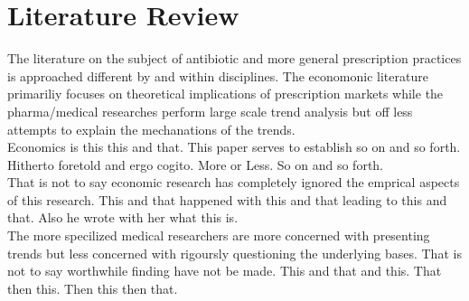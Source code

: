 \section{Literature Review}
The literature on the subject of antibiotic and more general prescription practices is approached different by and within disciplines. The economonic literature primariliy focuses on theoretical implications of prescription markets while the pharma/medical researches perform large scale trend analysis but off less attempts to explain the mechanations of the trends.\\
\indent Economics is this this and that. This paper serves to establish so on and so forth. Hitherto foretold and ergo cogito. More or Less. So on and so forth.\\
\indent That is not to say economic research has completely ignored the emprical aspects of this research. This and that happened with this and that leading to this and that. Also he wrote with her what this is.\\
\indent The more specilized medical researchers are more concerned with presenting trends but less concerned with rigoursly questioning the underlying bases. That is not to say worthwhile finding have not be made. This and that and this. That then this. Then this then that.